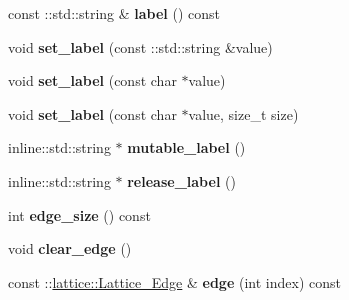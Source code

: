 \begin{DoxyCompactItemize}
\item 
\hypertarget{classlattice_1_1Lattice__Node_a4baa3c21b2ea94a045439efcae5ed84f}{
const ::std::string \& {\bfseries label} () const }
\label{classlattice_1_1Lattice__Node_a4baa3c21b2ea94a045439efcae5ed84f}

\item 
\hypertarget{classlattice_1_1Lattice__Node_a154cd811d4bc7555f2a5d3ba945be6eb}{
void {\bfseries set\_\-label} (const ::std::string \&value)}
\label{classlattice_1_1Lattice__Node_a154cd811d4bc7555f2a5d3ba945be6eb}

\item 
\hypertarget{classlattice_1_1Lattice__Node_a4dea106b2814ec3e429f9d0cff796338}{
void {\bfseries set\_\-label} (const char $\ast$value)}
\label{classlattice_1_1Lattice__Node_a4dea106b2814ec3e429f9d0cff796338}

\item 
\hypertarget{classlattice_1_1Lattice__Node_a6a66a9b418f72c0687cf00ad75abf201}{
void {\bfseries set\_\-label} (const char $\ast$value, size\_\-t size)}
\label{classlattice_1_1Lattice__Node_a6a66a9b418f72c0687cf00ad75abf201}

\item 
\hypertarget{classlattice_1_1Lattice__Node_aa8755ed4cf007a1c8e781902fdc3a4f6}{
inline::std::string $\ast$ {\bfseries mutable\_\-label} ()}
\label{classlattice_1_1Lattice__Node_aa8755ed4cf007a1c8e781902fdc3a4f6}

\item 
\hypertarget{classlattice_1_1Lattice__Node_a48ddd3b16c87cd84a030e1106d9c44a8}{
inline::std::string $\ast$ {\bfseries release\_\-label} ()}
\label{classlattice_1_1Lattice__Node_a48ddd3b16c87cd84a030e1106d9c44a8}

\item 
\hypertarget{classlattice_1_1Lattice__Node_a0e92a26f2f5180cc98f1de7c6917b6d2}{
int {\bfseries edge\_\-size} () const }
\label{classlattice_1_1Lattice__Node_a0e92a26f2f5180cc98f1de7c6917b6d2}

\item 
\hypertarget{classlattice_1_1Lattice__Node_a09e1fc45aba7522fc5949bf7328947b1}{
void {\bfseries clear\_\-edge} ()}
\label{classlattice_1_1Lattice__Node_a09e1fc45aba7522fc5949bf7328947b1}

\item 
\hypertarget{classlattice_1_1Lattice__Node_a8c03817565b5fdbeec75b612358e9f9e}{
const ::\hyperlink{classlattice_1_1Lattice__Edge}{lattice::Lattice\_\-Edge} \& {\bfseries edge} (int index) const }
\label{classlattice_1_1Lattice__Node_a8c03817565b5fdbeec75b612358e9f9e}


\end{DoxyCompactItemize}
